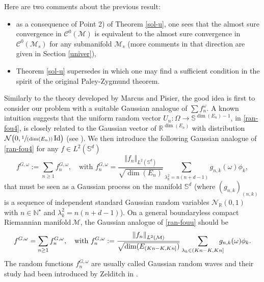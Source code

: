 \documentclass[10pt]{amsart}
\newcommand{\spfrac}[2]{\sfrac{#1}{(#2)}}
\theoremstyle{theorem}
\theoremstyle{definition}
\newcommand\R{\mathbb{R}}
\newcommand\N{\mathbb{N}}
\newcommand\bbS{\mathbb{S}}
\begin{document}
Here are two comments about the previous result:
\begin{itemize}
\item as a consequence of Point 2) of Theorem \ref{sol-u}, one sees that the almost sure convergence in $\mathcal{C}^0(\mathcal{M})$ is equivalent to the almost sure convergence in $\mathcal{C}^0(\mathcal{M}_s)$ for any submanifold $\mathcal{M}_s$ (more comments in that direction are given in Section \ref{univer}),
\item Theorem \ref{sol-u} supersedes \cite[Th.\,2.1]{imek-aif} in which one may find a sufficient condition in the spirit of the original Paley-Zygmund theorem.
\end{itemize}

Similarly to the theory developed by Marcus and Pisier, the good idea is first to consider our problem with a suitable Gaussian analogue of $\sum f_n^\omega$.
A known intuition suggests that the uniform random vector $U_n:\Omega\to \bbS^{\dim(E_n)-1}$, in \eqref{ran-fou4}, is closely related to the Gaussian vector of $\R^{\dim(E_n)}$ with distribution $\mathcal{N}\bigl(0,\spfrac{1}{\dim(E_n)}\operatorname{Id}\bigr)$ (see \cite[p.\,58]{pisiervol}). We then introduce the following Gaussian analogue of \eqref{ran-fou4} for any $f\in L^2(\bbS^d)$\vspace*{-3pt}
\begin{equation}\label{ran-fouG}
f^{G,\omega}:=\sum_{n\geq 1} f_n^{G,\omega}, \quad \text{with } f_n^{G,\omega}= \frac{\left\Vert f_n\right\Vert_{L^2(\bbS^d)}}{\sqrt{\dim(E_n)}}\sum_{\lambda_k^2=n(n+d-1)} g_{n,k} (\omega)\phi_k,
\end{equation}
that must be seen as a Gaussian process on the manifold $\bbS^d$ (where $(g_{n,k})_{(n,k)}$ is a sequence of independent standard Gaussian random variables $\mathcal{N}_\R(0,1)$ with $n\in \N^\star$ and $\lambda_k^2=n(n+d-1)$).
On a general boundaryless compact Riemannian manifold\,$\mathcal{M}$, the Gaussian analogue of \eqref{ran-fouu} should be\vspace*{-3pt}
\begin{equation} \label{ran-fouG2}
f^{G,\omega} = \sum_{n\geq 1}f_n^{G,\omega}, \quad \text{with } f_n^{G,\omega}:=\frac{\left\Vert f_n\right\Vert_{L^2(\mathcal{M})}}{\sqrt{\dim(E_{(Kn-K,Kn]})}}\sum_{\lambda_k \in (Kn-K,Kn]}\hspace*{-3mm} g_{n,k}(\omega) \phi_k.
\end{equation}
The random functions $f_n^{G,\omega}$ are usually called Gaussian random waves and their study had been introduced by Zelditch in \cite{zelditch2009real}.
\end{document}
